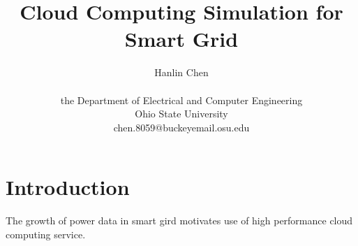 \documentclass[12pt]{article}
\begin{document}
\title{\textbf{Cloud Computing Simulation for Smart Grid}}
\author{Hanlin Chen\\\\the Department of Electrical and Computer Engineering\\Ohio State University\\ chen.8059@buckeyemail.osu.edu}
\maketitle 

\section{Introduction}
The growth of power  data in smart gird motivates use of high performance cloud computing  service.
\end{document}
